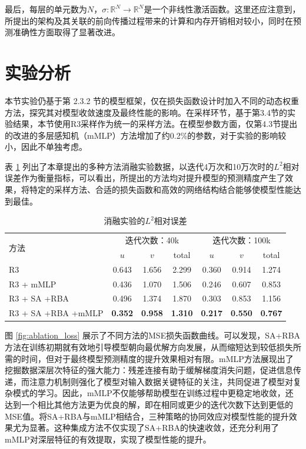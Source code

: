 最后，每层的单元数为$N$，$\sigma:\mathbb{R}^N\to\mathbb{R}^N$是一个非线性激活函数。这里还应注意到，所提出的架构及其关联的前向传播过程带来的计算和内存开销相对较小，同时在预测准确性方面取得了显著改进。

\section{实验分析}

本节实验仍基于第 2.3.2 节的模型框架，仅在损失函数设计时加入不同的动态权重方法，探究其对模型收敛速度及最终性能的影响。在采样环节，基于第3.4节的实验结果，本节使用R3采样作为统一的采样方法。在模型参数方面，仅第4.3节提出的改进的多层感知机（mMLP）方法增加了约0.2\%的参数，对于实验的影响较小，因此不单独考虑。

表 \ref{tab:my-table} 列出了本章提出的多种方法消融实验数据，以迭代4万次和10万次时的$L^2$相对误差作为衡量指标，可以看出，所提出的方法均对提升模型的预测精度产生了效果，将特定的采样方法、合适的损失函数和高效的网络结构结合能够使模型性能达到最佳。

\begin{table}[htbp]
    \centering
    \caption{消融实验的$L^2$相对误差}
    \label{tab:my-table}
    \begin{tabular}{@{}lcccccc@{}}
        \toprule
        \multirow{2}{*}{方法} & \multicolumn{3}{c}{迭代次数：40k} & \multicolumn{3}{c}{迭代次数：100k} \\
                 & $u$     & $v$     & total   & $u$     & $v$     & total   \\
        \midrule
        R3     & 0.643   & 1.656   & 2.299   & 0.360   & 0.914   & 1.274   \\
        R3 + mMLP & 0.436   & 1.070   & 1.506   & 0.246   & 0.607   & 0.853   \\
        R3 + SA +RBA & 0.496   & 1.374   & 1.870   & 0.303   & 0.853   & 1.156   \\
        R3 + SA +RBA +mMLP & \textbf{0.352}  & \textbf{0.958}  & \textbf{1.310}  & \textbf{0.217}  & \textbf{0.550}  & \textbf{0.767}\\ 
        \bottomrule
    \end{tabular}
\end{table}

图 \ref{fig:ablation_loss} 展示了不同方法的MSE损失函数曲线。可以发现，SA+RBA方法在训练初期就有效地引导模型朝向最优解方向发展，从而缩短达到较低损失所需的时间，但对于最终模型预测精度的提升效果相对有限。mMLP方法展现出了挖掘数据深层次特征的强大能力：残差连接有助于缓解梯度消失问题，促进信息传递，而注意力机制则强化了模型对输入数据关键特征的关注，共同促进了模型对复杂模式的学习。因此，mMLP不仅能够帮助模型在训练过程中更稳定地收敛，还达到一个相比其他方法更为优良的解，即在相同或更少的迭代次数下达到更低的MSE值。将SA+RBA与mMLP相结合，三种策略的协同效应对模型性能的提升效果尤为显著。这种集成方法不仅实现了SA+RBA的快速收敛，还充分利用了mMLP对深层特征的有效提取，实现了模型性能的提升。

